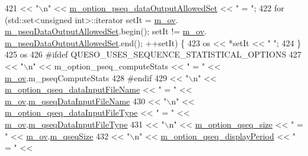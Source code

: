 \begin{DoxyCode}
421      << \textcolor{stringliteral}{"\(\backslash\)n"} << \hyperlink{class_q_u_e_s_o_1_1_monte_carlo_s_g_options_a496b1325324965abbeffd3ef8b919975}{m\_option\_pseq\_dataOutputAllowedSet} << \textcolor{stringliteral}{" = "};
422   \textcolor{keywordflow}{for} (std::set<unsigned int>::iterator setIt = \hyperlink{class_q_u_e_s_o_1_1_monte_carlo_s_g_options_a4bc6849a41ede87425cad9ab6e97df11}{m\_ov}.
      \hyperlink{class_q_u_e_s_o_1_1_mc_options_values_a264ab755cc81477580ef59ad7ffcd7e7}{m\_pseqDataOutputAllowedSet}.begin(); setIt != \hyperlink{class_q_u_e_s_o_1_1_monte_carlo_s_g_options_a4bc6849a41ede87425cad9ab6e97df11}{m\_ov}.
      \hyperlink{class_q_u_e_s_o_1_1_mc_options_values_a264ab755cc81477580ef59ad7ffcd7e7}{m\_pseqDataOutputAllowedSet}.end(); ++setIt) \{
423     os << *setIt << \textcolor{stringliteral}{" "};
424   \}
425   os
426 \textcolor{preprocessor}{#ifdef QUESO\_USES\_SEQUENCE\_STATISTICAL\_OPTIONS}
427 \textcolor{preprocessor}{}     << \textcolor{stringliteral}{"\(\backslash\)n"} << m\_option\_pseq\_computeStats         << \textcolor{stringliteral}{" = "} << \hyperlink{class_q_u_e_s_o_1_1_monte_carlo_s_g_options_a4bc6849a41ede87425cad9ab6e97df11}{m\_ov}.m\_pseqComputeStats
428 \textcolor{preprocessor}{#endif}
429 \textcolor{preprocessor}{}     << \textcolor{stringliteral}{"\(\backslash\)n"} << \hyperlink{class_q_u_e_s_o_1_1_monte_carlo_s_g_options_adfa1e97f82f761f277721e3002fa5be5}{m\_option\_qseq\_dataInputFileName}    << \textcolor{stringliteral}{" = "} << 
      \hyperlink{class_q_u_e_s_o_1_1_monte_carlo_s_g_options_a4bc6849a41ede87425cad9ab6e97df11}{m\_ov}.\hyperlink{class_q_u_e_s_o_1_1_mc_options_values_aedf79873213bca688ebbf6d873f42e8e}{m\_qseqDataInputFileName}
430      << \textcolor{stringliteral}{"\(\backslash\)n"} << \hyperlink{class_q_u_e_s_o_1_1_monte_carlo_s_g_options_a93530ee50a7e47ad57b46ca6cf04a60c}{m\_option\_qseq\_dataInputFileType}    << \textcolor{stringliteral}{" = "} << 
      \hyperlink{class_q_u_e_s_o_1_1_monte_carlo_s_g_options_a4bc6849a41ede87425cad9ab6e97df11}{m\_ov}.\hyperlink{class_q_u_e_s_o_1_1_mc_options_values_ac44d90277d7ba36d096ca5254614440d}{m\_qseqDataInputFileType}
431      << \textcolor{stringliteral}{"\(\backslash\)n"} << \hyperlink{class_q_u_e_s_o_1_1_monte_carlo_s_g_options_ab720df7bb4ec0dbffd231de174d30423}{m\_option\_qseq\_size}                 << \textcolor{stringliteral}{" = "} << 
      \hyperlink{class_q_u_e_s_o_1_1_monte_carlo_s_g_options_a4bc6849a41ede87425cad9ab6e97df11}{m\_ov}.\hyperlink{class_q_u_e_s_o_1_1_mc_options_values_a54e8c4bb7d5ffa7755da7d148019c86e}{m\_qseqSize}
432      << \textcolor{stringliteral}{"\(\backslash\)n"} << \hyperlink{class_q_u_e_s_o_1_1_monte_carlo_s_g_options_a14d5adea03855e45e535cf10cf8ea3ae}{m\_option\_qseq\_displayPeriod}        << \textcolor{stringliteral}{" = "} << 

\end{DoxyCode}
